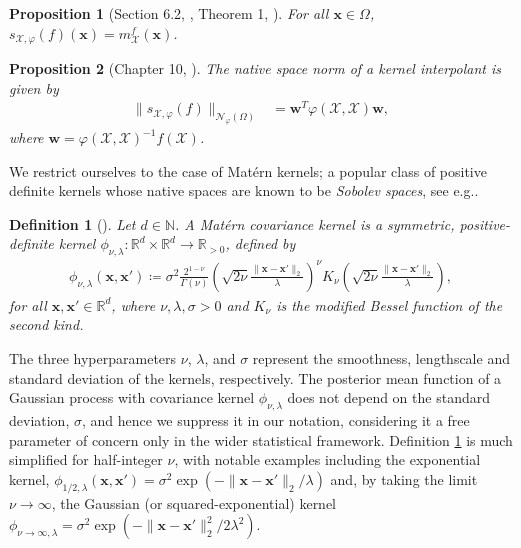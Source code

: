 \documentclass[pdflatex,sn-mathphys-num]{sn-jnl}%
\theoremstyle{thmstyleone}%
\newtheorem{proposition}{Proposition}%
\theoremstyle{thmstyletwo}%
\theoremstyle{thmstylethree}%
\newtheorem{definition}{Definition}%
\begin{document}
\begin{proposition}[Section 6.2, \cite{Rasmussen2005}, Theorem 1, \cite{Scholkopf2001}]\label{prop: mean functions are kernel interpolants}
For all \(\mathbf{x}\in\Omega\), \(s_{\mathcal{X},\varphi}(f)(\mathbf{x}) = m_{\mathcal{X}}^f(\mathbf{x})\). 
\end{proposition}
\begin{proposition}[Chapter 10, \cite{wendland_2004}]\label{prop: native space norm}
The native space norm of a kernel interpolant is given by
\begin{align}
\|s_{\mathcal{X},\varphi}(f)\|_{\mathcal{N}_{\varphi}(\Omega)}&=\mathbf{w}^T\varphi(\mathcal{X},\mathcal{X})\mathbf{w},\label{eq: norm of interpolant}
\end{align}
where \(\mathbf{w}=\varphi(\mathcal{X},\mathcal{X})^{-1}f(\mathcal{X})\).
\end{proposition} 
We restrict ourselves to the case of Mat\'ern kernels; a popular class of positive definite kernels whose native spaces are known to be \textit{Sobolev spaces}, see e.g.\cite{wendland_2004,Novak2018}. 
\begin{definition}[\cite{Lord_Powell_Shardlow_2014}]\label{def: 1D Matern}
    Let \(d\in\mathbb{N}\). A \emph{Mat\'ern covariance kernel} is a symmetric, positive-definite kernel \(\phi_{\nu,\lambda}:\mathbb{R}^d\times\mathbb{R}^d\rightarrow\mathbb{R}_{>0}\), defined by
    \begin{align}\label{eq:1d_matern}
        \phi_{\nu,\lambda}(\mathbf{x},\mathbf{x}')\coloneqq\sigma^2\frac{2^{1-\nu}}{\Gamma(\nu)}\left(\sqrt{2\nu}\frac{\|\mathbf{x}-\mathbf{x}'\|_2}{\lambda}\right)^{\nu}K_{\nu}\left(\sqrt{2\nu}\frac{\|\mathbf{x}-\mathbf{x}'\|_2}{\lambda}\right),
    \end{align}
    for all \(\mathbf{x},\mathbf{x}'\in\mathbb{R}^d\), where \(\nu,\lambda,\sigma>0\) and \(K_\nu\) is the modified Bessel function of the second kind. 
\end{definition}
The three hyperparameters \(\nu\), \(\lambda\), and \(\sigma\) represent the smoothness, lengthscale and standard deviation of the kernels, respectively. The posterior mean function of a Gaussian process with covariance kernel \(\phi_{\nu,\lambda}\) does not depend on the standard deviation, \(\sigma\), and hence we suppress it in our notation, considering it a free parameter of concern only in the wider statistical framework. Definition \ref{def: 1D Matern} is much simplified for half-integer \(\nu\), with notable examples including the exponential kernel, \(\phi_{1/2,\lambda}(\mathbf{x}, \mathbf{x}')=\sigma^2\exp(-\|\mathbf{x}-\mathbf{x}'\|_2/\lambda)\) and, by taking the limit \(\nu\rightarrow\infty\), the Gaussian (or squared-exponential) kernel \(\phi_{\nu\rightarrow\infty,\lambda}=\sigma^2\exp(-\|\mathbf{x}-\mathbf{x}'\|_2^2/2\lambda^2)\).
\end{document}
